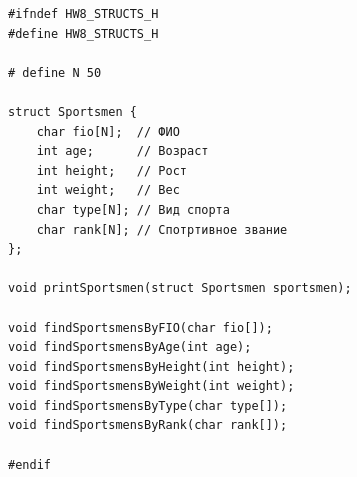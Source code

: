 \documentclass[12pt]{article}
\begin{document}

\begin{lstlisting}[label=structs.h, caption=structs.h]
#ifndef HW8_STRUCTS_H
#define HW8_STRUCTS_H

# define N 50

struct Sportsmen {
    char fio[N];  // ФИО
    int age;      // Возраст
    int height;   // Рост
    int weight;   // Вес
    char type[N]; // Вид спорта
    char rank[N]; // Спотртивное звание
};

void printSportsmen(struct Sportsmen sportsmen);

void findSportsmensByFIO(char fio[]);
void findSportsmensByAge(int age);
void findSportsmensByHeight(int height);
void findSportsmensByWeight(int weight);
void findSportsmensByType(char type[]);
void findSportsmensByRank(char rank[]);

#endif
\end{lstlisting} 

\newpage
\end{document}
